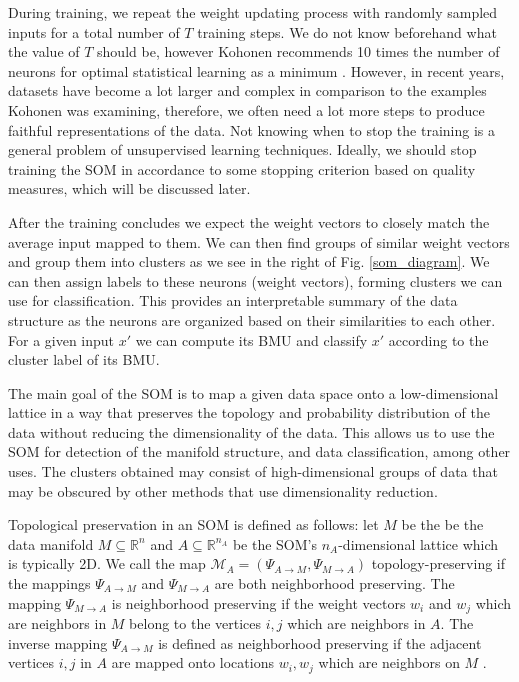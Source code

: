 During training, we repeat the weight updating process with randomly sampled inputs for a total number of $T$ training steps. We do not know beforehand what the value of $T$ should be, however Kohonen recommends 10 times the number of neurons for optimal statistical learning as a minimum \cite{kohonen97}. However, in recent years, datasets have become a lot larger and complex in comparison to the examples Kohonen was examining, therefore, we often need a lot more steps to produce faithful representations of the data. 
Not knowing when to stop the training is a general problem of unsupervised learning techniques. Ideally, we should stop training the SOM in accordance to some stopping criterion based on quality measures, which will be discussed later. 

After the training concludes we expect the weight vectors to closely match the average input mapped to them. We can then find groups of similar weight vectors and group them into clusters as we see in the right of Fig. \ref{som_diagram}. We can then assign labels to these neurons (weight vectors), forming clusters we can use for classification. This provides an interpretable summary of the data structure as the neurons are organized based on their similarities to each other. For a given input $x'$ we can compute its BMU and classify $x'$ according to the cluster label of its BMU.

The main goal of the SOM is to map a given data space onto a low-dimensional lattice in a way that preserves the topology and probability distribution of the data without reducing the dimensionality of the data. This allows us to use the SOM for detection of the manifold structure, and data classification, among other uses. The clusters obtained may consist of high-dimensional groups of data that may be obscured by other methods that use dimensionality reduction.
 
Topological preservation in an SOM is defined as follows: let $M$ be the be the data manifold $M \subseteq \mathbb{R}^n$ and $A \subseteq \mathbb{R}^{n_A}$ be the SOM's $n_A$-dimensional lattice which is typically 2D.  We call the map $\mathcal{M}_A = (\Psi_{A \rightarrow M}, \Psi_{M \rightarrow A})$ topology-preserving if the mappings $\Psi_{A \rightarrow M}$ and $\Psi_{M \rightarrow A}$ are both neighborhood preserving. The mapping $\Psi_{M \rightarrow A}$ is neighborhood preserving if the weight vectors $w_i$ and $w_j$ which are neighbors in $M$ belong to the vertices $i, j$ which are neighbors in $A$. The inverse mapping $\Psi_{A \rightarrow M}$ is defined as neighborhood preserving if the adjacent vertices $i, j$ in $A$ are mapped onto locations $w_i, w_j$ which are neighbors on
$M$ \cite{topology_preservation}.

